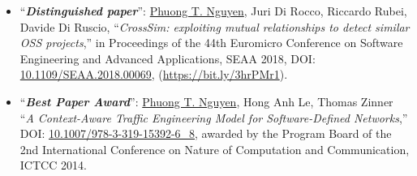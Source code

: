 \documentclass[a4paper,9pt]{article} %
\begin{document}
\begin{itemize}
    \item ``\textbf{\emph{Distinguished paper}}'': \underline{Phuong T. Nguyen}, Juri Di Rocco, Riccardo Rubei, Davide Di Ruscio, ``\emph{CrossSim: exploiting mutual relationships to detect similar OSS projects},'' in Proceedings of the 44th Euromicro Conference on	Software Engineering and Advanced Applications, SEAA 2018, DOI: \href{https://doi.org/10.1109/SEAA.2018.00069}{10.1109/SEAA.2018.00069}, (\href{https://bit.ly/3hrPMr1}{https://bit.\-ly/3hrPMr1}).		
    
	\item ``\textbf{\emph{Best Paper Award}}'': \underline{Phuong T. Nguyen}, Hong Anh Le, Thomas Zinner ``\emph{A Context-Aware Traffic Engineering Model for Software-Defined Networks},'' DOI: \href{https://doi.org/10.1007/978-3-319-15392-6\_8}{10.1007/978-3-319-15392-6\_8}, awarded by the Program Board of the 2nd International Conference on Nature of Computation and Communication, ICTCC 2014.    
	
\end{itemize}

\end{document}

